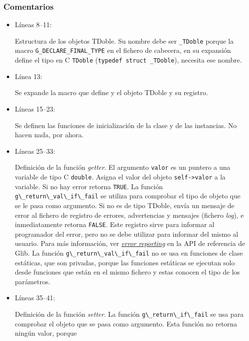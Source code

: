 \subsubsection{Comentarios}
\begin{itemize}
\item Líneas 8--11:\par
  Estructura de los objetos \textsf{TDoble}. Su nombre debe ser \texttt{\_TDoble} porque la macro
  \texttt{G\_DECLARE\_FINAL\_TYPE} en el fichero de cabecera, en su expansión define el tipo en C
  \texttt{TDoble} (\texttt{typedef struct \_TDoble}), necesita ese nombre.
\item Línea 13:\par
  Se expande la macro que define y  el objeto \textsf{TDoble} y su registro.
\item Líneas 15--23:\par
  Se definen las funciones de inicialización de la clase y de las instancias. No hacen nada, por ahora.
\item Líneas 25--33:\par
  Definición de la función \textit{getter}. El argumento \texttt{valor} es un puntero a una variable de tipo C
  \texttt{double}. Asigna el valor del objeto \texttt{self->valor} a la variable. Si no hay error retorna \texttt{TRUE}.
  La función \passthrough{\lstinline!g\_return\_val\_if\_fail!} se utiliza para comprobar el tipo de objeto que
  se le pasa como argumento. Si no es de tipo \textsf{TDoble}, envía un mensaje de error al fichero
  de registro de errores, advertencias y mensajes (fichero \textit{log}), e inmediatamente retorna \texttt{FALSE}.
  Este registro sirve para informar al programador del error, pero no se debe utilizar para informar del
  mismo al usuario. Para más información, ver \href{https://docs.gtk.org/glib/error-reporting.html}
  {\textit{error reporting}} en la API de referencia de Glib.
  {\color{red}
  La función \passthrough{\lstinline!g\_return\_val\_if\_fail!} no se usa en funciones de clase estáticas, que son
  privadas, porque las funciones estáticas se ejecutan solo desde funciones que están en el mismo fichero y estas
  conocen el tipo de los parámetros\footnotemark{}.}
\item Líneas 35--41:\par
  Definición de la función \textit{setter}. La función \passthrough{\lstinline!g\_return\_if\_fail!} se usa
  para comprobar el objeto que se pasa como argumento. Esta función no retorna ningún valor, porque

\end{itemize}

